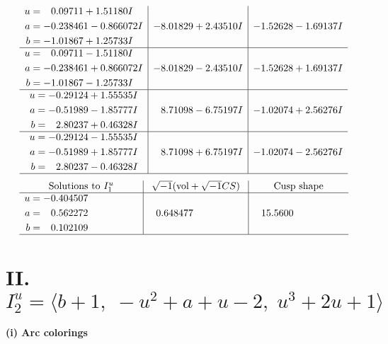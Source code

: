 \documentclass[1p]{elsarticle_modified}
\theoremstyle{definition}
\newcommand{\I}{\sqrt{-1}}
\begin{document}
$$\begin{array}{c|c|c}
\begin{aligned}
u &= \phantom{-}0.09711 + 1.51180 I \\
a &= -0.238461 - 0.866072 I \\
b &= -1.01867 + 1.25733 I\end{aligned}
 & -8.01829 + 2.43510 I & -1.52628 - 1.69137 I \\ \hline\begin{aligned}
u &= \phantom{-}0.09711 - 1.51180 I \\
a &= -0.238461 + 0.866072 I \\
b &= -1.01867 - 1.25733 I\end{aligned}
 & -8.01829 - 2.43510 I & -1.52628 + 1.69137 I \\ \hline\begin{aligned}
u &= -0.29124 + 1.55535 I \\
a &= -0.51989 - 1.85777 I \\
b &= \phantom{-}2.80237 + 0.46328 I\end{aligned}
 & \phantom{-}8.71098 - 6.75197 I & -1.02074 + 2.56276 I \\ \hline\begin{aligned}
u &= -0.29124 - 1.55535 I \\
a &= -0.51989 + 1.85777 I \\
b &= \phantom{-}2.80237 - 0.46328 I\end{aligned}
 & \phantom{-}8.71098 + 6.75197 I & -1.02074 - 2.56276 I\\
 \hline 
 \end{array}$$\newpage$$\begin{array}{c|c|c}  
\text{Solutions to }I^u_{1}& \I (\text{vol} + \sqrt{-1}CS) & \text{Cusp shape}\\
 \hline 
\begin{aligned}
u &= -0.404507\phantom{ +0.000000I} \\
a &= \phantom{-}0.562272\phantom{ +0.000000I} \\
b &= \phantom{-}0.102109\phantom{ +0.000000I}\end{aligned}
 & \phantom{-}0.648477\phantom{ +0.000000I} & \phantom{-}15.5600\phantom{ +0.000000I}\\
 \hline 
 \end{array}$$\newpage\newpage\renewcommand{\arraystretch}{1}
\centering \section*{II. $I^u_{2}= \langle b+1,\;- u^2+a+u-2,\;u^3+2 u+1 \rangle$}
\flushleft \textbf{(i) Arc colorings}\\
\end{document}
